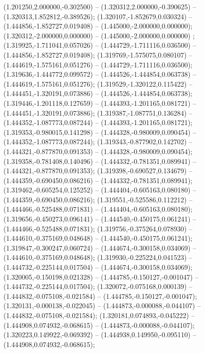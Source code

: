  (1.201250,2.000000,-0.302500) -- (1.320312,2.000000,-0.390625) -- (1.320313,1.852812,-0.389526);
 (1.320107,-1.852679,0.030324) -- (1.444856,-1.852727,0.019408) -- (1.445000,-2.000000,0.000000);
 (1.320312,-2.000000,0.000000) -- (1.445000,-2.000000,0.000000) ;
 (1.319925,-1.711041,0.057026) -- (1.444729,-1.711116,0.036500) -- (1.444856,-1.852727,0.019408);
 (1.319769,-1.575075,0.080107) -- (1.444619,-1.575161,0.051276) -- (1.444729,-1.711116,0.036500);
 (1.319636,-1.444772,0.099572) -- (1.444526,-1.444854,0.063738) -- (1.444619,-1.575161,0.051276);
 (1.319529,-1.320122,0.115422) -- (1.444451,-1.320191,0.073886) -- (1.444526,-1.444854,0.063738);
 (1.319446,-1.201118,0.127659) -- (1.444393,-1.201165,0.081721) -- (1.444451,-1.320191,0.073886);
 (1.319387,-1.087751,0.136284) -- (1.444352,-1.087773,0.087244) -- (1.444393,-1.201165,0.081721);
 (1.319353,-0.980015,0.141298) -- (1.444328,-0.980009,0.090454) -- (1.444352,-1.087773,0.087244);
 (1.319343,-0.877902,0.142702) -- (1.444321,-0.877870,0.091353) -- (1.444328,-0.980009,0.090454);
 (1.319358,-0.781408,0.140496) -- (1.444332,-0.781351,0.089941) -- (1.444321,-0.877870,0.091353);
 (1.319398,-0.690527,0.134679) -- (1.444359,-0.690450,0.086216) -- (1.444332,-0.781351,0.089941);
 (1.319462,-0.605254,0.125252) -- (1.444404,-0.605163,0.080180) -- (1.444359,-0.690450,0.086216);
 (1.319551,-0.525586,0.112212) -- (1.444466,-0.525488,0.071831) -- (1.444404,-0.605163,0.080180);
 (1.319656,-0.450273,0.096141) -- (1.444540,-0.450175,0.061241) -- (1.444466,-0.525488,0.071831);
 (1.319756,-0.375264,0.078930) -- (1.444610,-0.375169,0.048648) -- (1.444540,-0.450175,0.061241);
 (1.319847,-0.300247,0.060724) -- (1.444674,-0.300158,0.034069) -- (1.444610,-0.375169,0.048648);
 (1.319930,-0.225224,0.041523) -- (1.444732,-0.225144,0.017504) -- (1.444674,-0.300158,0.034069);
 (1.320005,-0.150198,0.021328) -- (1.444785,-0.150127,-0.001047) -- (1.444732,-0.225144,0.017504);
 (1.320072,-0.075168,0.000139) -- (1.444832,-0.075108,-0.021584) -- (1.444785,-0.150127,-0.001047);
 (1.320131,-0.000138,-0.022045) -- (1.444873,-0.000088,-0.044107) -- (1.444832,-0.075108,-0.021584);
 (1.320181,0.074893,-0.045222) -- (1.444908,0.074932,-0.068615) -- (1.444873,-0.000088,-0.044107);
 (1.320223,0.149922,-0.069392) -- (1.444938,0.149950,-0.095110) -- (1.444908,0.074932,-0.068615);
